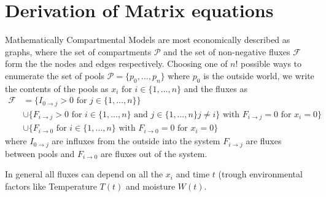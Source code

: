 \section{Derivation of Matrix equations}
\label{appendix:MatrixDerivation}
Mathematically Compartmental Models are most economically described as graphs, where the set of compartments $\mathcal{P}$ and the set of non-negative fluxes $\mathcal{F}$ form the the nodes and edges respectively. 
Choosing one of $n!$ possible ways to enumerate  the set of pools $\mathcal{P}=\{p_0,\dots,p_n\}$ where $p_0$ is the outside world, we write the contents of the pools as $x_i \text{ for } i \in \{1,\dots,n\} $ and the fluxes as
\begin{align*}
\mathcal{F} &=
\{
I_{0 \rightarrow j} > 0
\text{ for } j \in \{1,\dots ,n\}
\}  
\\
&
\cup
\{
F_{i \rightarrow j} > 0
\text{ for } i \in \{1,\dots ,n\} 
\text{ and } j \in \{1,\dots ,n\} j\ne i
\}
\text{ with }
F_{i \rightarrow j}=0 \text{ for }  x_{i} = 0 
\}
\\
&
\cup
\{
F_{i \rightarrow 0} 
\text{ for } i \in \{1,\dots ,n\} 
\text{ with }
F_{i \rightarrow 0}=0 \text{ for }  x_{i} = 0 
\}
\end{align*}
\label{massbalance} 
where 
$ 
I_{0 \rightarrow j} 
$
are influxes from the outside into the system 
$
F_{i \rightarrow j} 
$
are fluxes between pools 
and 
$
F_{i \rightarrow 0} 
$
are fluxes out of the system.

In general all fluxes can depend on all the $x_i$  and time $t$ (trough environmental factors like  Temperature $T(t)$ and moisture $W(t)$.

